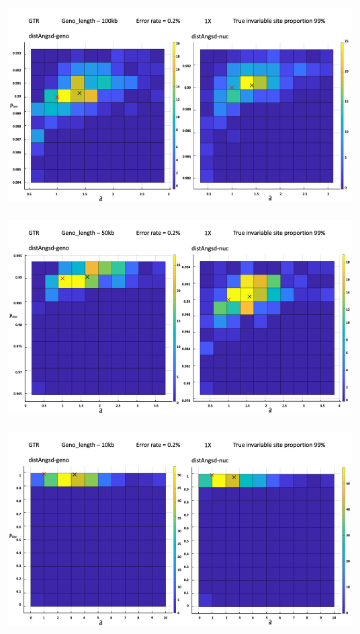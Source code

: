 \documentclass{article}
\begin{document}
\begin{figure}
\begin{subfigure}{.5\textwidth}
  \caption{}
  \label{fig:2D99s3}
\end{subfigure}
\begin{subfigure}{.5\textwidth}
  \centering
  \includegraphics[width=.99\linewidth]{100k99.png}  
  \caption{}
  \label{fig:2D99s4}
\end{subfigure}
\newline
\begin{subfigure}{.5\textwidth}
  \centering
  \includegraphics[width=.99\linewidth]{50k99.png}  
  \caption{}
  \label{fig:2D99s5}
\end{subfigure}
\begin{subfigure}{.5\textwidth}
  \centering
  \includegraphics[width=.99\linewidth]{10k99.png}  

\end{subfigure}
\end{figure}
\end{document}
